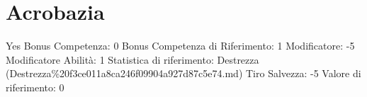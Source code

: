 \section{Acrobazia}\label{acrobazia}

\begin{description}
\tightlist
\item[Tags: ABI]
Yes Bonus Competenza: 0 Bonus Competenza di Riferimento: 1 Modificatore:
-5 Modificatore Abilità: 1 Statistica di riferimento: Destrezza
(Destrezza\%20f3ce011a8ca246f09904a927d87c5e74.md) Tiro Salvezza: -5
Valore di riferimento: 0
\end{description}
